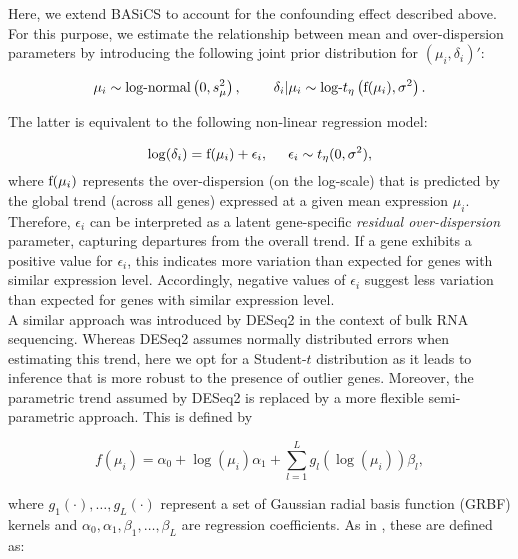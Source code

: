 Here, we extend BASiCS to account for the confounding effect described above. For this purpose, we estimate the relationship between mean and over-dispersion parameters by introducing the following joint prior distribution for $(\mu_i, \delta_i)'$: 

\begin{equation} \label{eq::jointprior} \mu_i \sim \mbox{log-normal}\left(0, s^2_{\mu}\right), \hspace{0.8cm}
\delta_i | \mu_i \sim \mbox{log-}t_{\eta}\left( \textnormal{f}(\mu_i), \sigma^2 \right).
\end{equation} 

The latter is equivalent to the following non-linear regression model:

\begin{equation} \label{eq::regression}
\log(\delta_i) =\textnormal{f}(\mu_i)+\epsilon_i, \hspace{0.5cm} \epsilon_i \sim{}t_{\eta}(0,\sigma^2), 
\end{equation} where $\textnormal{f}(\mu_i)$ represents the over-dispersion (on the log-scale) that is predicted by the global trend (across all genes) expressed at a given mean expression $\mu_i$. Therefore, $\epsilon_i$ can be interpreted as a latent gene-specific {\it residual over-dispersion} parameter, capturing departures from the overall trend. If a gene exhibits a positive value for $\epsilon_i$, this indicates more variation than expected for genes with similar expression level. Accordingly, negative values of $\epsilon_i$ suggest less variation than expected for genes with similar expression level. \\ 

A similar approach was introduced by DESeq2 \citep{Love2014a} in the context of bulk RNA sequencing. Whereas DESeq2 assumes normally distributed errors when estimating this trend, here we opt for a Student-$t$ distribution as it leads to inference that is more robust to the presence of outlier genes. Moreover, the parametric trend assumed by DESeq2 is replaced by a more flexible semi-parametric approach. This is defined by

\begin{equation} \label{eq::trend}
f(\mu_i) = \alpha_0 + \log(\mu_i)\alpha_1 + \sum_{l=1}^L g_l(\log(\mu_i))\beta_l,
\end{equation} 

where $g_1(\cdot), \ldots, g_L(\cdot)$ represent a set of Gaussian radial basis function (GRBF) kernels and $\alpha_0, \alpha_1, \beta_1, \ldots, \beta_L$ are regression coefficients. As in \cite{Kapourani2016}, these are defined as: 

